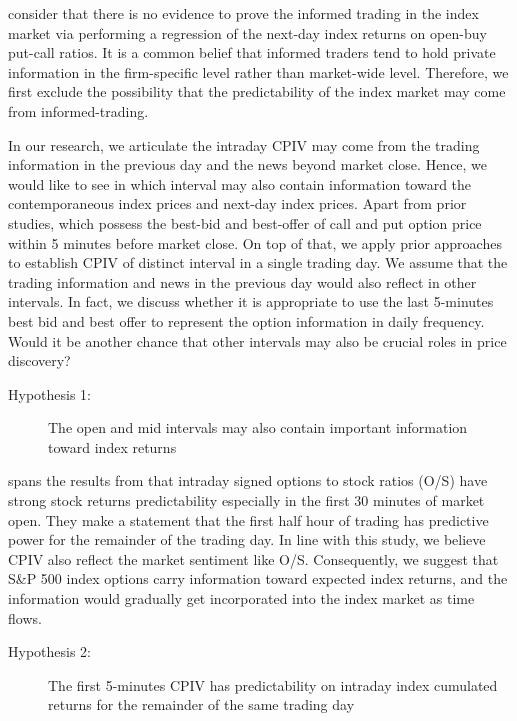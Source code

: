 
\textcite{pan2006information} consider that there is no evidence to prove the informed trading in the index market via performing a regression of the next-day index returns on open-buy put-call ratios. It is a common belief that informed traders tend to hold private information in the firm-specific level rather than market-wide level. Therefore, we first exclude the possibility that the predictability of the index market may come from informed-trading. 

In our research, we articulate the intraday CPIV may come from the trading information in the previous day and the news beyond market close. Hence, we would like to see in which interval may also contain information toward the contemporaneous index prices and next-day index prices. Apart from prior studies, which possess the best-bid and best-offer of call and put option price within 5 minutes before market close. On top of that, we apply prior approaches to establish CPIV of distinct interval in a single trading day. We assume that the trading information and news in the previous day would also reflect in other intervals. In fact, we discuss whether it is appropriate to use the last 5-minutes best bid and best offer to represent the option information in daily frequency. Would it be another chance that other intervals may also be crucial roles in price discovery? 

\begin{description}
\item[Hypothesis 1:] The open and mid intervals may also contain important information toward index returns
\end{description}

\textcite{bergsma2018intraday} spans the results from \textcite{easley1998option} that intraday signed options to stock ratios (O/S) have strong stock returns predictability especially in the first 30 minutes of market open. They make a statement that the first half hour of trading has predictive power for the remainder of the trading day. In line with this study, we believe CPIV also reflect the market sentiment like O/S. Consequently, we suggest that S\&P 500 index options carry information toward expected index returns, and the information would gradually get incorporated into the index market as time flows. 

\begin{description} 
\item[Hypothesis 2:] The first 5-minutes CPIV has predictability on intraday index cumulated returns for the remainder of the same trading day
\end{description}




